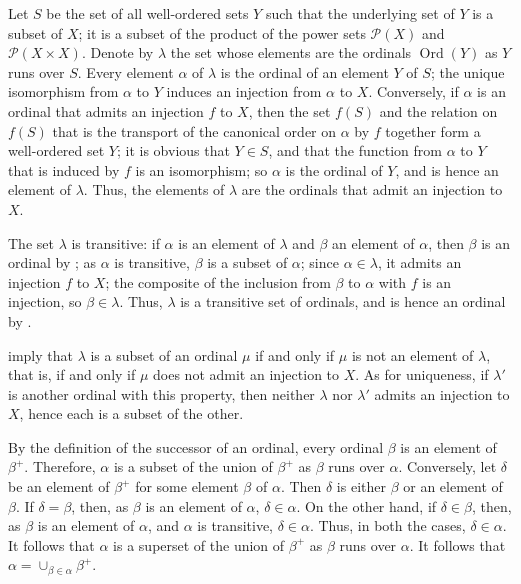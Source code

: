 \documentclass{article}
\begin{document}
\begin{solution}[\ref{exe:qqhmi7in}]
  \label{sol:lzxv2f03}
  Let \(S\) be the set of all well-ordered sets \(Y\) such that the
  underlying set of \(Y\) is a subset of \(X\); it is a subset of the
  product of the power sets \(\mathcal{P}(X)\) and
  \(\mathcal{P}(X \times X)\).  Denote by \(\lambda\) the set whose
  elements are the ordinals \(\operatorname{Ord}(Y)\) as \(Y\) runs
  over \(S\).  Every element \(\alpha\) of \(\lambda\) is the ordinal
  of an element \(Y\) of \(S\); the unique isomorphism from \(\alpha\)
  to \(Y\) induces an injection from \(\alpha\) to \(X\).  Conversely,
  if \(\alpha\) is an ordinal that admits an injection \(f\) to \(X\),
  then the set \(f(S)\) and the relation on \(f(S)\) that is the
  transport of the canonical order on \(\alpha\) by \(f\) together
  form a well-ordered set \(Y\); it is obvious that \(Y \in S\), and
  that the function from \(\alpha\) to \(Y\) that is induced by \(f\)
  is an isomorphism; so \(\alpha\) is the ordinal of \(Y\), and is
  hence an element of \(\lambda\).  Thus, the elements of \(\lambda\)
  are the ordinals that admit an injection to \(X\).

  The set \(\lambda\) is transitive: if \(\alpha\) is an element of
  \(\lambda\) and \(\beta\) an element of \(\alpha\), then \(\beta\)
  is an ordinal by ; as \(\alpha\) is transitive,
  \(\beta\) is a subset of \(\alpha\); since \(\alpha \in \lambda\),
  it admits an injection \(f\) to \(X\); the composite of the
  inclusion from \(\beta\) to \(\alpha\) with \(f\) is an injection,
  so \(\beta \in \lambda\).  Thus, \(\lambda\) is a transitive set of
  ordinals, and is hence an ordinal by .

   imply that \(\lambda\) is a subset
  of an ordinal \(\mu\) if and only if \(\mu\) is not an element of
  \(\lambda\), that is, if and only if \(\mu\) does not admit an
  injection to \(X\).  As for uniqueness, if \(\lambda'\) is another
  ordinal with this property, then neither \(\lambda\) nor
  \(\lambda'\) admits an injection to \(X\), hence each is a subset of
  the other.
\end{solution}

\begin{solution}[\ref{exe:qgdrw0j7}]
  \label{sol:pfhq76oe}
  By the definition of the successor of an ordinal, every ordinal
  \(\beta\) is an element of \(\beta^+\).  Therefore, \(\alpha\) is a
  subset of the union of \(\beta^+\) as \(\beta\) runs over
  \(\alpha\).  Conversely, let \(\delta\) be an element of \(\beta^+\)
  for some element \(\beta\) of \(\alpha\).  Then \(\delta\) is either
  \(\beta\) or an element of \(\beta\).  If \(\delta = \beta\), then,
  as \(\beta\) is an element of \(\alpha\), \(\delta \in \alpha\).  On
  the other hand, if \(\delta \in \beta\), then, as \(\beta\) is an
  element of \(\alpha\), and \(\alpha\) is transitive,
  \(\delta \in \alpha\).  Thus, in both the cases,
  \(\delta \in \alpha\).  It follows that \(\alpha\) is a superset of
  the union of \(\beta^+\) as \(\beta\) runs over \(\alpha\).  It
  follows that \(\alpha = \cup_{\beta \in \alpha}\beta^+\).
\end{solution}
\end{document}

